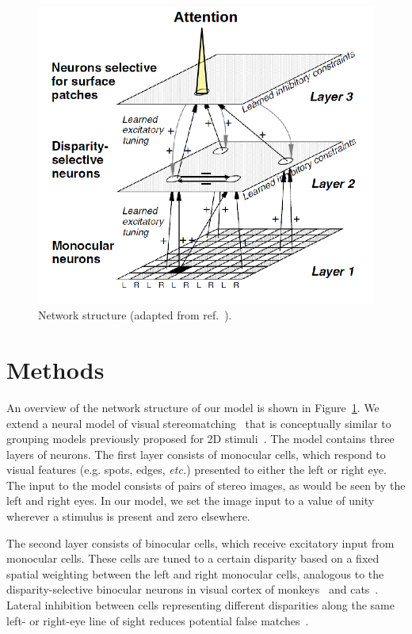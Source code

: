 \begin{figure}[t]
\centering
\includegraphics[width=3 in]{3D-Surface/figs/groupingcircuit}
\makeatletter
\let\@currsize\normalsize
\caption{Network structure (adapted from ref.~\cite{Marshall_etal96}).}
\label{NetworkStructure}
\end{figure}

\section{Methods}
An overview of the network structure of our model is shown in
Figure~\ref{NetworkStructure}. We extend a neural model of visual
stereomatching~\cite{Marshall_etal96} that is conceptually similar to
grouping models previously proposed for 2D stimuli~\cite{Craft_etal07, Mihalas_etal11b, Russell_etal14}. The model contains three layers of neurons. The first layer consists of monocular cells, which respond to visual features (e.g. spots, edges, {\em etc.}) presented to either the left or right eye. The input to the model consists of pairs of stereo images, as would be seen by the left and right eyes. In our model, we set the image input to a value of unity wherever a stimulus is present and zero elsewhere.

The second layer consists of binocular cells, which receive excitatory
input from monocular cells. These cells are tuned to a certain disparity based on a fixed spatial weighting between the left and right monocular cells, analogous to the disparity-selective binocular neurons in visual cortex of monkeys~\cite{Poggio_Fischer77, Poggio_Poggio84} and cats~\cite{Bishop_Pettigrew86, Ohzawa_etal90}. Lateral inhibition between cells representing different disparities along the same left- or right-eye line of sight reduces potential false matches~\cite{Marr_Poggio76}.

